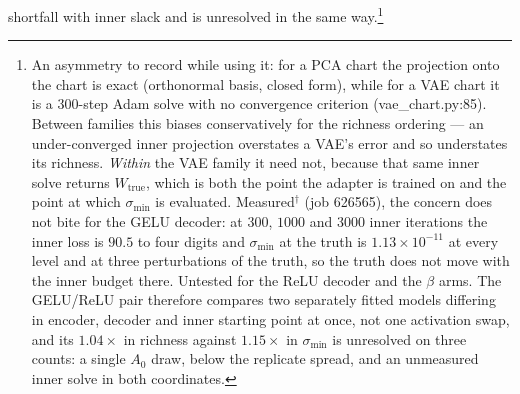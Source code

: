 shortfall with inner slack and is unresolved in the same way.\footnote{An asymmetry to record while using it: for a PCA chart the
projection onto the chart is exact (orthonormal basis, closed form), while
for a VAE chart it is a $300$-step Adam solve with no convergence criterion
(vae\_chart.py:85). Between families this biases conservatively for the
richness ordering — an under-converged inner projection overstates a VAE's
error and so understates its richness. \emph{Within} the VAE family it need
not, because that same inner solve returns $W_{\mathrm{true}}$, which is both
the point the adapter is trained on and the point at which $\sigma_{\min}$ is
evaluated. Measured$^\dagger$ (job 626565), the concern does not bite for the
GELU decoder: at $300$, $1000$ and $3000$ inner iterations the inner loss is
$90.5$ to four digits and $\sigma_{\min}$ at the truth is
$1.13\times10^{-11}$ at every level and at three perturbations of the truth,
so the truth does not move with the inner budget there. Untested for the
ReLU decoder and the $\beta$ arms. The GELU/ReLU pair
therefore compares two separately fitted models differing in encoder,
decoder and inner starting point at once, not one activation swap, and its
$1.04\times$ in richness against $1.15\times$ in $\sigma_{\min}$ is
unresolved on three counts: a single $A_0$ draw, below the replicate spread,
and an unmeasured inner solve in both coordinates.}

